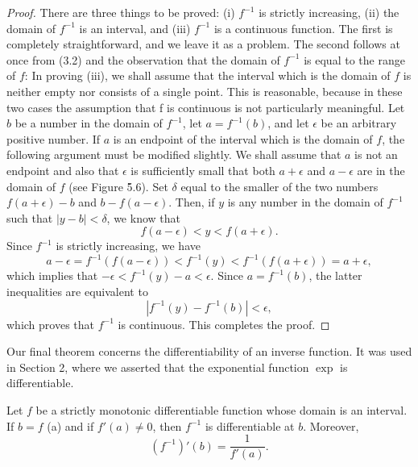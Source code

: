 \begin{proof}
There are three things to be proved: (i) $f^{-1}$ is strictly increasing, (ii) the domain of $f^{-1}$ is an interval, and (iii) $f^{-1}$ is a continuous function. The first is completely straightforward,
and we leave it as a problem. The second follows at once from (3.2) and the observation that the domain of $f^{-1}$ is equal to the range of $f$: In proving (iii), we shall assume that the interval which is the domain of $f$ is neither empty nor consists of a single point. This is reasonable, because in these two cases the assumption that f is continuous is not particularly meaningful. Let $b$ be a number in the domain of $f^{-1}$, let $a = f^{-1}(b)$, and let $\epsilon$ be an arbitrary positive number. If $a$ is an endpoint of the interval which is the domain of $f$, the following argument must be modified slightly. We shall assume that $a$ is not an endpoint and also that $\epsilon$ is sufficiently small that both $a + \epsilon$ and $a - \epsilon$ are in the domain of $f$ (see Figure \f{5.6}). Set $\delta$ equal to the smaller of the two numbers $f(a + \epsilon) - b$ and $b - f(a - \epsilon)$. Then, 
if $y$ is any number in the domain of $f^{-1}$ such that $|y - b| < \delta$, we know that 
$$
f(a - \epsilon) < y < f(a + \epsilon).
$$
Since $f^{-1}$ is strictly increasing, we have
$$
a - \epsilon = f^{-1}(f(a - \epsilon)) < f^{-1}(y) < f^{-1}(f(a + \epsilon)) = a + \epsilon,
$$
which implies that $-\epsilon  < f^{-1}(y) -a < \epsilon$. Since $a = f^{-1}(b)$, the latter inequalities are equivalent to
$$
| f^{-1}(y) - f^{-1}(b)| < \epsilon,
$$
which proves that $f^{-1}$ is continuous. This completes the proof.
\end{proof}

Our final theorem concerns the differentiability of an inverse function. It was used in Section 2, where we asserted that the exponential function $\exp$ is differentiable.
 
\begin{theorem}
\label{thm 5.3.4}
Let $f$ be a strictly monotonic differentiable function whose domain is an interval. If $b = f$ (a) and if $f'(a) \neq 0$, then $f^{-1}$ is differentiable at $b$. Moreover,
$$
(f^{-1})'(b)=  \frac{1}{f'(a)}.
$$
\end{theorem}

